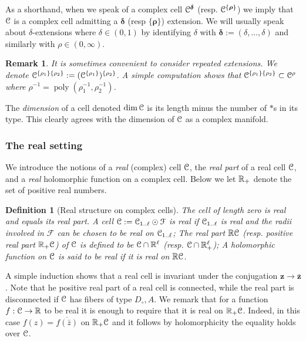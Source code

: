 \documentclass[reqno]{amsart}
\newtheorem{Def}[Cor]{Definition}{\bfseries}{\rmfamily}
\newtheorem{Rem}[Cor]{Remark}{\scshape}{\rmfamily}
\renewcommand\~[1]{\widetilde{#1}}
\def\poly{\operatorname{poly}} \def\J{\operatorname{J}}
\def\cF{{\mathcal F}} \def\cL{{\mathcal L}} \def\cR{{\mathcal R}}
\def\vz{{\mathbf z}}
\def\vdelta{{\boldsymbol\delta}}
\def\vrho{{\boldsymbol\rho}}
\def\he#1{{\{#1\}}}
\def\hvrho{{\he\vrho}}
\begin{document}
As a shorthand, when we speak of a complex cell $\cC^\vdelta$
(resp. $\cC^\hvrho$) we imply that ${\mathcal C}$ is a complex cell admitting a
$\vdelta$ (resp $\hvrho$) extension. We will usually speak about
$\delta$-extensions where $\delta\in(0,1)$ by identifying $\delta$
with $\vdelta:=(\delta,\ldots,\delta)$ and similarly with
$\rho\in(0,\infty)$.

\begin{Rem}\label{rem:repeated-ext}
  It is sometimes convenient to consider repeated extensions. We
  denote
  $\cC^{\he{\rho_1}\he{\rho_2}}:=(\cC^{\he{\rho_1}})^{\he{\rho_2}}$. A
  simple computation shows that
  $\cC^{\he{\rho_1}\he{\rho_2}}\subset\cC^\rho$ where
  $\rho^{-1}=\poly(\rho_1^{-1},\rho_2^{-1})$.
\end{Rem}

The \emph{dimension} of a cell denoted $\dim{\mathcal C}$ is its length minus
the number of $*$s in its type. This clearly agrees with the dimension
of ${\mathcal C}$ as a complex manifold.


\subsubsection{The real setting}

We introduce the notions of a \emph{real} (complex) cell ${\mathcal C}$, the
\emph{real part} of a real cell ${\mathcal C}$, and a \emph{real} holomorphic
function on a complex cell. Below we let ${\mathbb R}_+$ denote the set of
positive real numbers.

\begin{Def}[Real structure on complex cells]
  The cell of length zero is real and equals its real part. A cell
  $\cC:=\cC_{1..\ell}\odot\cF$ is real if ${\mathcal C}_{1..\ell}$ is real and
  the radii involved in $\cF$ can be chosen to be real on
  ${\mathcal C}_{1..\ell}$; The real part ${\mathbb R}{\mathcal C}$ (resp. positive real part
  ${\mathbb R}_+{\mathcal C}$) of ${\mathcal C}$ is defined to be ${\mathcal C}\cap{\mathbb R}^\ell$
  (resp. ${\mathcal C}\cap{\mathbb R}_+^\ell$); A holomorphic function on ${\mathcal C}$ is said
  to be real if it is real on ${\mathbb R}{\mathcal C}$.
\end{Def}
A simple induction shows that a real cell is invariant under the
conjugation $\vz\to\bar\vz$. Note that he positive real part of a real
cell is connected, while the real part is disconnected if ${\mathcal C}$ has
fibers of type $D_\circ,A$. We remark that for a function $f:{\mathcal C}\to{\mathbb R}$
to be real it is enough to require that it is real on
${\mathbb R}_+{\mathcal C}$. Indeed, in this case $f(z)=\overline{f(\bar z)}$ on
${\mathbb R}_+{\mathcal C}$ and it follows by holomorphicity the equality holds over
${\mathcal C}$.
\end{document}
